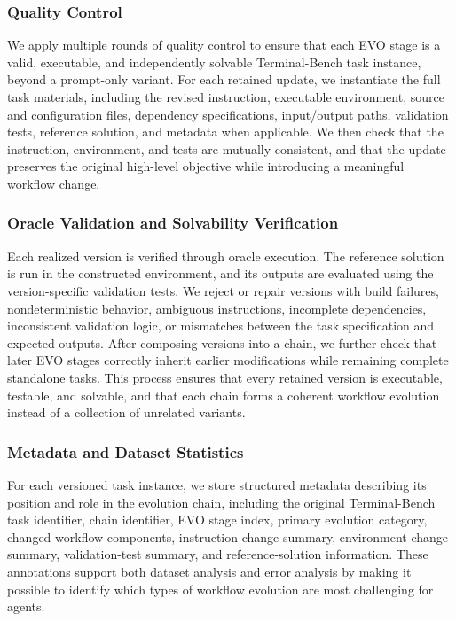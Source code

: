 \documentclass{llmxive}
\begin{document}
\subsubsection{Quality Control}
\label{app:terminal_quality_control}
We apply multiple rounds of quality control to ensure that each EVO stage is a valid, executable, and independently solvable Terminal-Bench task instance, beyond a prompt-only variant. For each retained update, we instantiate the full task materials, including the revised instruction, executable environment, source and configuration files, dependency specifications, input/output paths, validation tests, reference solution, and metadata when applicable. We then check that the instruction, environment, and tests are mutually consistent, and that the update preserves the original high-level objective while introducing a meaningful workflow change.

\subsubsection{Oracle Validation and Solvability Verification}
\label{app:terminal_oracle_validation}
Each realized version is verified through oracle execution. The reference solution is run in the constructed environment, and its outputs are evaluated using the version-specific validation tests. We reject or repair versions with build failures, nondeterministic behavior, ambiguous instructions, incomplete dependencies, inconsistent validation logic, or mismatches between the task specification and expected outputs. After composing versions into a chain, we further check that later EVO stages correctly inherit earlier modifications while remaining complete standalone tasks. This process ensures that every retained version is executable, testable, and solvable, and that each chain forms a coherent workflow evolution instead of a collection of unrelated variants.


\subsubsection{Metadata and Dataset Statistics}
\label{app:terminal_metadata_stats}
For each versioned task instance, we store structured metadata describing its position and role in the evolution chain, including the original Terminal-Bench task identifier, chain identifier, EVO stage index, primary evolution category, changed workflow components, instruction-change summary, environment-change summary, validation-test summary, and reference-solution information. These annotations support both dataset analysis and error analysis by making it possible to identify which types of workflow evolution are most challenging for agents.
\end{document}
